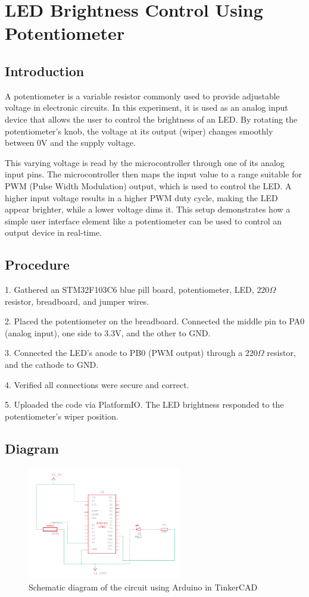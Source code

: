 \section{LED Brightness Control Using Potentiometer}

\subsection{Introduction}
A potentiometer is a variable resistor commonly used to provide
adjustable voltage in electronic circuits. In this experiment,
it is used as an analog input device that allows the user to control
the brightness of an LED. By rotating the potentiometer’s knob,
the voltage at its output (wiper) changes smoothly between 0V and
the supply voltage.

This varying voltage is read by the microcontroller through one of
its analog input pins. The microcontroller then maps the input value
to a range suitable for PWM (Pulse Width Modulation) output,
which is used to control the LED. A higher input voltage results
in a higher PWM duty cycle, making the LED appear brighter,
while a lower voltage dims it. This setup demonstrates how a simple
user interface element like a potentiometer can be used to control
an output device in real-time.



\subsection{Procedure}
1. Gathered an STM32F103C6 blue pill board, potentiometer, LED, $220\Omega$ resistor,
breadboard, and jumper wires.

2. Placed the potentiometer on the breadboard.
Connected the middle pin to PA0 (analog input), one side to 3.3V, and the other to GND.

3. Connected the LED's anode to PB0 (PWM output) through a $220\Omega$ 
resistor, and the cathode to GND.

4. Verified all connections were secure and correct.

5. Uploaded the code via PlatformIO. The LED brightness responded to the
potentiometer's wiper position.
\subsection{Diagram}
\begin{figure}[htbp]
    \centering
    \includegraphics[width=0.6\textwidth]{img/pot.png}
    \caption{Schematic diagram of the circuit using Arduino in TinkerCAD}\label{fig:pott}
\end{figure}

